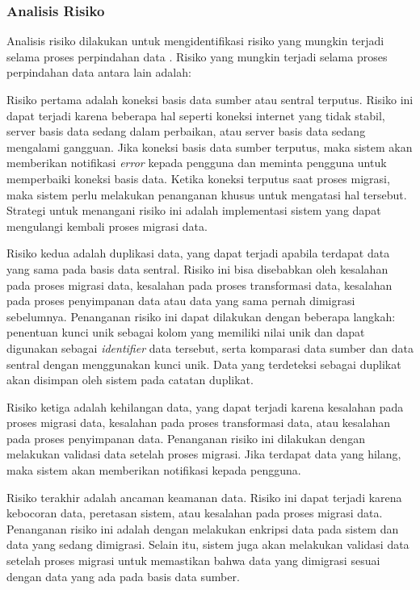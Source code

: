 \subsubsection{Analisis Risiko}
Analisis risiko dilakukan untuk mengidentifikasi risiko yang mungkin terjadi selama proses perpindahan data \cite{Hussien2021}. Risiko yang mungkin terjadi selama proses perpindahan data antara lain adalah:

Risiko pertama adalah koneksi basis data sumber atau sentral terputus. Risiko ini dapat terjadi karena beberapa hal seperti koneksi internet yang tidak stabil, server basis data sedang dalam perbaikan, atau server basis data sedang mengalami gangguan. Jika koneksi basis data sumber terputus, maka sistem akan memberikan notifikasi \emph{error} kepada pengguna dan meminta pengguna untuk memperbaiki koneksi basis data. Ketika koneksi terputus saat proses migrasi, maka sistem perlu melakukan penanganan khusus untuk mengatasi hal tersebut. Strategi untuk menangani risiko ini adalah implementasi sistem yang dapat mengulangi kembali proses migrasi data.

Risiko kedua adalah duplikasi data, yang dapat terjadi apabila terdapat data yang sama pada basis data sentral. Risiko ini bisa disebabkan oleh kesalahan pada proses migrasi data, kesalahan pada proses transformasi data, kesalahan pada proses penyimpanan data atau data yang sama pernah dimigrasi sebelumnya. Penanganan risiko ini dapat dilakukan dengan beberapa langkah: penentuan kunci unik sebagai kolom yang memiliki nilai unik dan dapat digunakan sebagai \emph{identifier} data tersebut, serta komparasi data sumber dan data sentral dengan menggunakan kunci unik. Data yang terdeteksi sebagai duplikat akan disimpan oleh sistem pada catatan duplikat.

Risiko ketiga adalah kehilangan data, yang dapat terjadi karena kesalahan pada proses migrasi data, kesalahan pada proses transformasi data, atau kesalahan pada proses penyimpanan data. Penanganan risiko ini dilakukan dengan melakukan validasi data setelah proses migrasi. Jika terdapat data yang hilang, maka sistem akan memberikan notifikasi kepada pengguna.

Risiko terakhir adalah ancaman keamanan data. Risiko ini dapat terjadi karena kebocoran data, peretasan sistem, atau kesalahan pada proses migrasi data. Penanganan risiko ini adalah dengan melakukan enkripsi data pada sistem dan data yang sedang dimigrasi. Selain itu, sistem juga akan melakukan validasi data setelah proses migrasi untuk memastikan bahwa data yang dimigrasi sesuai dengan data yang ada pada basis data sumber.

